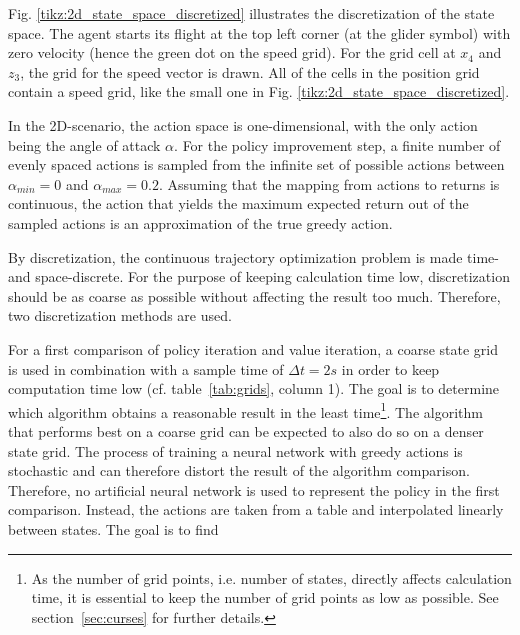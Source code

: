 Fig. \ref{tikz:2d_state_space_discretized} illustrates the discretization of the state space. The agent starts its flight at the top left corner (at the glider symbol) with zero velocity (hence the green dot on the speed grid). For the grid cell at $x_4$ and $z_3$, the grid for the speed vector is drawn. All of the cells in the position grid contain a speed grid, like the small one in Fig. \ref{tikz:2d_state_space_discretized}.

In the 2D-scenario, the action space is one-dimensional, with the only action being the angle of attack $\alpha$. For the policy improvement step, a finite number of evenly spaced actions is sampled from the infinite set of possible actions between $\alpha_{min} = 0$ and $\alpha_{max}=0.2$. Assuming that the mapping from actions to returns is continuous, the action that yields the maximum expected return out of the sampled actions is an approximation of the true greedy action.

By discretization, the continuous trajectory optimization problem is made time- and space-discrete. For the purpose of keeping calculation time low, discretization should be as coarse as possible without affecting the result too much. Therefore, two discretization methods are used. 

For a first comparison of policy iteration and value iteration, a coarse state grid is used in combination with a sample time of $\Delta t = 2s$ in order to keep computation time low (cf. table~\ref{tab:grids}, column 1). The goal is to determine which algorithm obtains a reasonable result in the least time\footnote{As the number of grid points, i.e. number of states, directly affects calculation time, it is essential to keep the number of grid points as low as possible. See section~\ref{sec:curses} for further details.}. The algorithm that performs best on a coarse grid can be expected to also do so on a denser state grid.
The process of training a neural network with greedy actions is stochastic and can therefore distort the result of the algorithm comparison. Therefore, no artificial neural network is used to represent the policy in the first comparison. Instead, the actions are taken from a table and interpolated linearly between states. The goal is to find 

